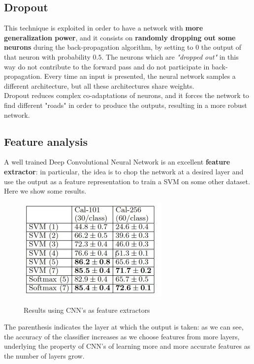 \subsection{Dropout} This technique is exploited in order to have a network with \textbf{more generalization power}, and it consists on \textbf{randomly dropping out some neurons} during the back-propagation algorithm, by setting to 0 the output of that neuron with probability $0.5$. The neurons which are \textit{"dropped out"} in this way do not contribute to the forward pass and do not participate in back-propagation. Every time an input is presented, the neural network samples a different architecture, but all these architectures share weights.\\
Dropout reduces complex co-adaptations of neurons, and it forces the network to find different "roads" in order to produce the outputs, resulting in a more robust network.

\subsection{Feature analysis}
A well trained Deep Convolutional Neural Network is an excellent \textbf{feature extractor}: in particular, the idea is to chop the network at a desired layer and use the output as a feature representation to train a SVM on some other dataset. Here we show some results.

\begin{figure}[h!]
		\centering
        \includegraphics[scale = 2.0]{img/feature extraction.jpg}
		\label{mi}
        \caption{Results using CNN's as feature extractors}
\end{figure}

The parenthesis indicates the layer at which the output is taken: as we can see, the accuracy of the classifier increases as we choose features from more layers, underlying the property of CNN's of learning more and more accurate features as the number of layers grow.

